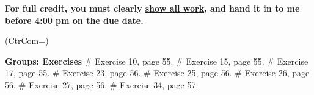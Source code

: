 \documentclass[11pt]{book}
\begin{document}
\thispagestyle{fancy}
\noindent	\textbf{For full credit, you must clearly \underline{show all work}, and hand it  in to me before 4:00 pm on the due date.}\hfill
\vspace{0.3in}

\begin{easylist}
\ListProperties(CtrCom=\fbox)

\noindent \textbf{Groups: Exercises}
\vspace{0.5in}
# Exercise 10, page 55.
\vspace{0.2in}
# Exercise 15, page 55.
\vspace{0.2in}
# Exercise 17, page 55.
\vspace{0.2in}
# Exercise 23, page 56.
\vspace{0.2in}
# Exercise 25, page 56.
\vspace{0.2in}
# Exercise 26, page 56. 
\vspace{0.2in}
# Exercise 27, page 56.
\vspace{0.2in}
# Exercise 34, page 57.
 \end{easylist}
\end{document}
